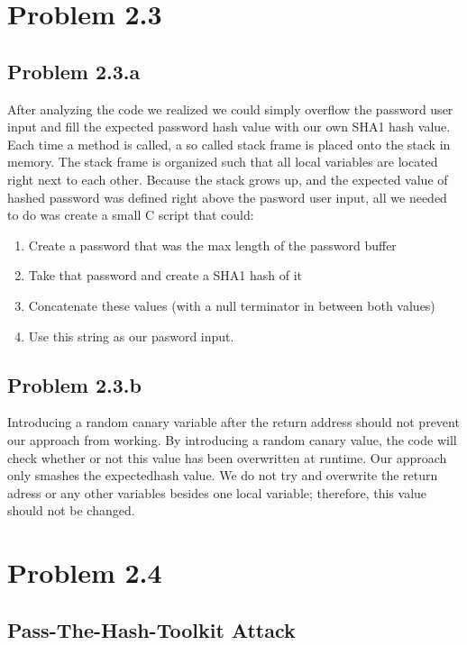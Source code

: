 \documentclass[psamsfonts]{amsart}
\begin{document}
 \section*{Problem 2.3}

 \subsection*{Problem 2.3.a}
 After analyzing the code we realized we could simply overflow the password user input and fill the expected password hash value with our own SHA1 hash value.  Each time a method is called, a so called stack frame is placed onto the stack in memory.  The stack frame is organized such that all local variables are located right next to each other.  Because the stack grows up, and the expected value of hashed password was defined right above the pasword user input, all we needed to do was create a small C script that could:

     \begin{enumerate}[(1)]
       \item Create a password that was the max length of the password buffer
       \item Take that password and create a SHA1 hash of it
       \item Concatenate these values (with a null terminator in between both values)
       \item Use this string as our pasword input.
     \end{enumerate}

 \subsection*{Problem 2.3.b}
    Introducing a random canary variable after the return address should not prevent our approach from working.  By introducing a random canary value, the code will check whether or not this value has been overwritten at runtime.  Our approach only smashes the expectedhash value.  We do not try and overwrite the return adress or any other variables besides one local variable; therefore, this value should not be changed.

\section*{Problem 2.4}

\subsection*{Pass-The-Hash-Toolkit Attack}
\end{document}
